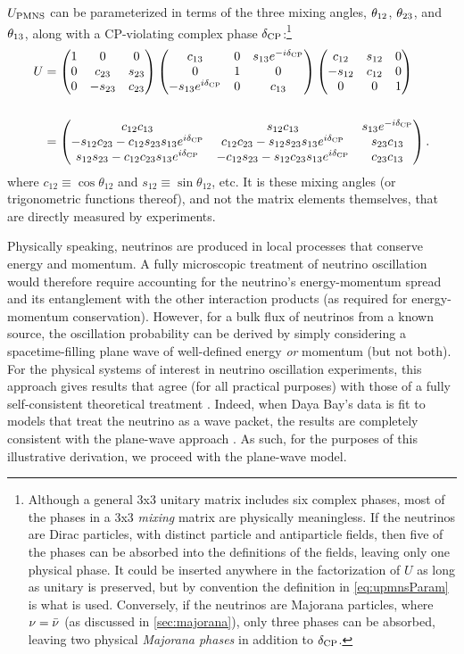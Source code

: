 \documentclass[../thesis.tex]{subfiles}
\begin{document}
$U_\mathrm{PMNS}$ can be parameterized in terms of the three mixing angles, $\theta_{12}$, $\theta_{23}$, and $\theta_{13}$, along with a CP-violating complex phase $\delta_\text{CP}$:\footnote{Although a general 3x3 unitary matrix includes six complex phases, most of the phases in a 3x3 \emph{mixing} matrix are physically meaningless. If the neutrinos are Dirac particles, with distinct particle and antiparticle fields, then five of the phases can be absorbed into the definitions of the fields, leaving only one physical phase. It could be inserted anywhere in the factorization of $U$ as long as unitary is preserved, but by convention the definition in \autoref{eq:upmnsParam} is what is used. Conversely, if the neutrinos are Majorana particles, where $\nu = \bar\nu$ (as discussed in \autoref{sec:majorana}), only three phases can be absorbed, leaving two physical \emph{Majorana phases} in addition to $\delta_\text{CP}$.}
\begin{align}
  \label{eq:upmnsParam}
  \begin{split}
    U &= \begin{pmatrix} 1 & 0 & 0 \\ 0 & c_{23} & s_{23} \\ 0 & -s_{23} & c_{23} \end{pmatrix} \begin{pmatrix} c_{13} & 0 & s_{13}e^{-i\delta_\text{CP}} \\ 0 & 1 & 0 \\ -s_{13}e^{i\delta_\text{CP}} & 0 & c_{13} \end{pmatrix} \begin{pmatrix} c_{12} & s_{12} & 0 \\ -s_{12} & c_{12} & 0 \\ 0 & 0 & 1 \end{pmatrix} \\\\
    &= \begin{pmatrix} c_{12}c_{13} & s_{12} c_{13} & s_{13}e^{-i\delta_\text{CP}} \\ -s_{12}c_{23} - c_{12}s_{23}s_{13}e^{i\delta_\text{CP}} & c_{12}c_{23} - s_{12}s_{23}s_{13}e^{i\delta_\text{CP}} & s_{23}c_{13}\\s_{12}s_{23} - c_{12}c_{23}s_{13}e^{i\delta_\text{CP}} & -c_{12}s_{23} - s_{12}c_{23}s_{13}e^{i\delta_\text{CP}} & c_{23}c_{13} \end{pmatrix}.
  \end{split}
\end{align}
where \(c_{12} \equiv \cos\theta_{12}\) and \(s_{12} \equiv \sin\theta_{12}\), etc. It is these mixing angles (or trigonometric functions thereof), and not the matrix elements themselves, that are directly measured by experiments.

Physically speaking, neutrinos are produced in local processes that conserve energy and momentum. A fully microscopic treatment of neutrino oscillation would therefore require accounting for the neutrino's energy-momentum spread and its entanglement with the other interaction products (as required for energy-momentum conservation). However, for a bulk flux of neutrinos from a known source, the oscillation probability can be derived by simply considering a spacetime-filling plane wave of well-defined energy \emph{or} momentum (but not both). For the physical systems of interest in neutrino oscillation experiments, this approach gives results that agree (for all practical purposes) with those of a fully self-consistent theoretical treatment \cite{Ligeti}. Indeed, when Daya Bay's data is fit to models that treat the neutrino as a wave packet, the results are completely consistent with the plane-wave approach \cite{DayaBayWavePacket}. As such, for the purposes of this illustrative derivation, we proceed with the plane-wave model.
\end{document}
